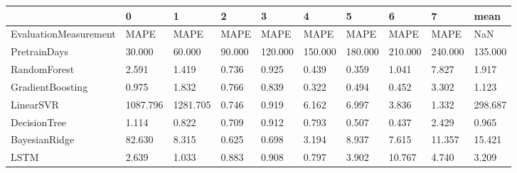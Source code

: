 \begin{tabular}{llllllllll}
\toprule
{} &        0 &        1 &      2 &       3 &       4 &       5 &       6 &       7 &    mean \\
\midrule
EvaluationMeasurement &     MAPE &     MAPE &   MAPE &    MAPE &    MAPE &    MAPE &    MAPE &    MAPE &     NaN \\
PretrainDays          &   30.000 &   60.000 & 90.000 & 120.000 & 150.000 & 180.000 & 210.000 & 240.000 & 135.000 \\
RandomForest          &    2.591 &    1.419 &  0.736 &   0.925 &   0.439 &   0.359 &   1.041 &   7.827 &   1.917 \\
GradientBoosting      &    0.975 &    1.832 &  0.766 &   0.839 &   0.322 &   0.494 &   0.452 &   3.302 &   1.123 \\
LinearSVR             & 1087.796 & 1281.705 &  0.746 &   0.919 &   6.162 &   6.997 &   3.836 &   1.332 & 298.687 \\
DecisionTree          &    1.114 &    0.822 &  0.709 &   0.912 &   0.793 &   0.507 &   0.437 &   2.429 &   0.965 \\
BayesianRidge         &   82.630 &    8.315 &  0.625 &   0.698 &   3.194 &   8.937 &   7.615 &  11.357 &  15.421 \\
LSTM                  &    2.639 &    1.033 &  0.883 &   0.908 &   0.797 &   3.902 &  10.767 &   4.740 &   3.209 \\
\bottomrule
\end{tabular}
